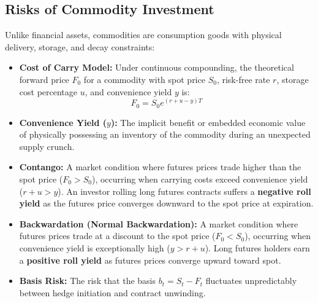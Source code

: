 \subsection{Risks of Commodity Investment}

Unlike financial assets, commodities are consumption goods with physical delivery, storage, and decay constraints:
\begin{itemize}[leftmargin=1.5em, itemsep=2pt]
    \item \textbf{Cost of Carry Model:} Under continuous compounding, the theoretical forward price $F_0$ for a commodity with spot price $S_0$, risk-free rate $r$, storage cost percentage $u$, and convenience yield $y$ is:
    \begin{equation}
    F_0 = S_0 e^{(r + u - y)T}
    \end{equation}
    \item \textbf{Convenience Yield ($y$):} The implicit benefit or embedded economic value of physically possessing an inventory of the commodity during an unexpected supply crunch.
    \item \textbf{Contango:} A market condition where futures prices trade higher than the spot price ($F_0 > S_0$), occurring when carrying costs exceed convenience yield ($r + u > y$). An investor rolling long futures contracts suffers a \textbf{negative roll yield} as the futures price converges downward to the spot price at expiration.
    \item \textbf{Backwardation (Normal Backwardation):} A market condition where futures prices trade at a discount to the spot price ($F_0 < S_0$), occurring when convenience yield is exceptionally high ($y > r + u$). Long futures holders earn a \textbf{positive roll yield} as futures prices converge upward toward spot.
    \item \textbf{Basis Risk:} The risk that the basis $b_t = S_t - F_t$ fluctuates unpredictably between hedge initiation and contract unwinding.
\end{itemize}

